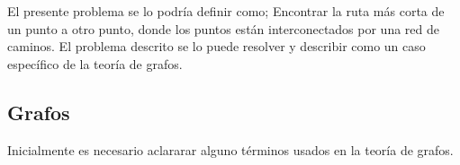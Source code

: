 El presente problema se lo podría definir como; Encontrar la ruta más corta de un punto a otro punto, donde los puntos están interconectados por una red de caminos. El problema descrito se lo puede resolver y describir como un caso específico de la teoría de grafos.



  \subsection{Grafos} %
  \label{sec:teoria_grafos}


      Inicialmente es necesario aclararar alguno términos usados en la teoría de grafos.



